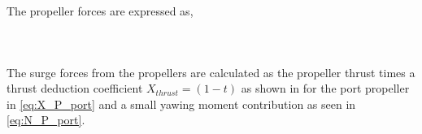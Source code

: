 \begin{equation}
    \label{eq:N_H}
    
\end{equation}

The propeller forces are expressed as,

\begin{equation}
    \label{eq:X_P}
    
\end{equation}

\begin{equation}
    \label{eq:Y_P}
    
\end{equation}

\begin{equation}
    \label{eq:N_P}
    
\end{equation}

The surge forces from the propellers are calculated as the propeller thrust times a thrust deduction coefficient $X_{thrust}=(1-t)$ as shown in for the port propeller in \autoref{eq:X_P_port} and a small yawing moment contribution as seen in \autoref{eq:N_P_port}.
\begin{equation}
    \label{eq:X_P_port}
    
\end{equation}

\begin{equation}
    \label{eq:N_P_port}
    
\end{equation}